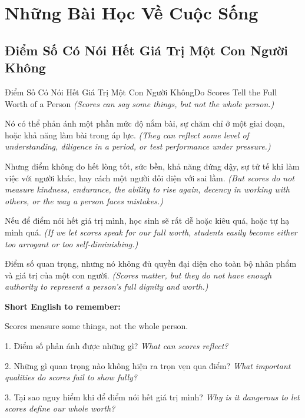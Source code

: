 \chapter{Những Bài Học Về Cuộc Sống}

\section{Điểm Số Có Nói Hết Giá Trị Một Con Người Không}
\begin{truyen}{Điểm Số Có Nói Hết Giá Trị Một Con Người Không}{Do Scores Tell the Full Worth of a Person}
\textit{(Scores can say some things, but not the whole person.)}

Nó có thể phản ánh một phần mức độ nắm bài, sự chăm chỉ ở một giai đoạn, hoặc khả năng làm bài trong áp lực.
\textit{(They can reflect some level of understanding, diligence in a period, or test performance under pressure.)}

Nhưng điểm không đo hết lòng tốt, sức bền, khả năng đứng dậy, sự tử tế khi làm việc với người khác, hay cách một người đối diện với sai lầm.
\textit{(But scores do not measure kindness, endurance, the ability to rise again, decency in working with others, or the way a person faces mistakes.)}

Nếu để điểm nói hết giá trị mình, học sinh sẽ rất dễ hoặc kiêu quá, hoặc tự hạ mình quá.
\textit{(If we let scores speak for our full worth, students easily become either too arrogant or too self-diminishing.)}
\end{truyen}

\begin{baihoc}
Điểm số quan trọng, nhưng nó không đủ quyền đại diện cho toàn bộ nhân phẩm và giá trị của một con người.
\textit{(Scores matter, but they do not have enough authority to represent a person's full dignity and worth.)}
\end{baihoc}

\begin{ghinhoanh}
\textbf{Short English to remember:}

Scores measure some things, not the whole person.

\end{ghinhoanh}

\begin{tuhocnhanh}
1. Điểm số phản ánh được những gì? \textit{What can scores reflect?}

2. Những gì quan trọng nào không hiện ra trọn vẹn qua điểm? \textit{What important qualities do scores fail to show fully?}

3. Tại sao nguy hiểm khi để điểm nói hết giá trị mình? \textit{Why is it dangerous to let scores define our whole worth?}
\end{tuhocnhanh}
\ngancach

